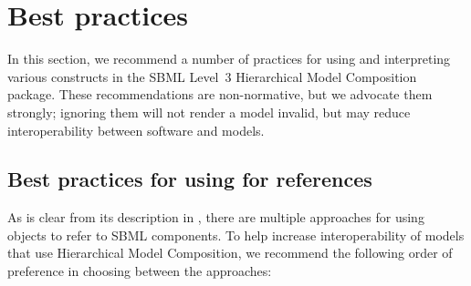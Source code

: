 
\section{Best practices}
\label{best-practices}

In this section, we recommend a number of practices for using and interpreting various constructs in the SBML Level~3 Hierarchical Model Composition package.  These recommendations are non-normative, but we advocate them strongly; ignoring them will not render a model invalid, but may reduce interoperability between software and models.


\subsection{Best practices for using  for references}
\label{best-practices-sbaseref}

As is clear from its description in , there are multiple approaches for using \SBaseRef objects to refer to SBML components.  To help increase interoperability of models that use Hierarchical Model Composition, we recommend the following order of preference in choosing between the approaches:


